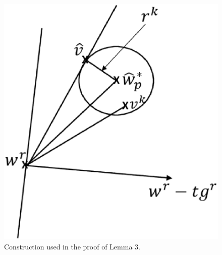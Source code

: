 \begin{figure}
\begin{center}
\includegraphics[width=0.8\columnwidth]{spherefig}
\caption{Construction used in the proof of Lemma 3.}
\end{center}
\label{spherefig}
\end{figure}


